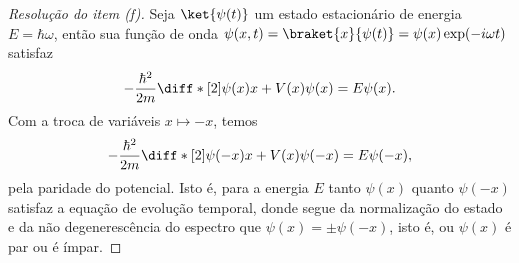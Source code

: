 \begin{proof}[Resolução do item (f)]
    Seja \(\ket{\psi(t)}\) um estado estacionário de energia \(E = \hbar \omega\), então sua função de onda \(\psi(x,t) = \braket{x}{\psi(t)} = \psi(x)\exp(-i\omega t)\) satisfaz
    \begin{equation*}
        -\frac{\hbar^2}{2m} \diff*[2]{\psi(x)}{x} + V(x)\psi(x) = E \psi(x).
    \end{equation*}
    Com a troca de variáveis \(x \mapsto -x\), temos
    \begin{equation*}
        -\frac{\hbar^2}{2m} \diff*[2]{\psi(-x)}{x} + V(x)\psi(-x) = E\psi(-x),
    \end{equation*}
    pela paridade do potencial. Isto é, para a energia \(E\) tanto \(\psi(x)\) quanto \(\psi(-x)\) satisfaz a equação de evolução temporal, donde segue da normalização do estado e da não degenerescência do espectro que \(\psi(x) = \pm \psi(-x)\), isto é, ou \(\psi(x)\) é par ou é ímpar.
\end{proof}
